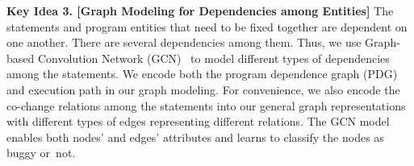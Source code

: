 {\bf Key Idea 3. [Graph Modeling for Dependencies among Entities]} The
statements and program entities that need to be fixed together are
dependent on one another. There are several dependencies among
them. Thus, we use Graph-based Convolution Network
(GCN)~\cite{li2019gcn} to model different types of dependencies among
the statements. We encode both the program dependence graph (PDG) and
execution path in our graph modeling.  For convenience, we also encode
the co-change relations among the statements into our general graph
representations with different types of edges representing different
relations. The GCN model enables both nodes' and edges' attributes and
learns to classify the nodes as buggy or~not.









